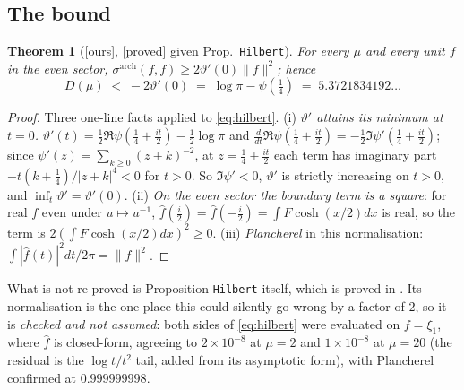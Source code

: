 \documentclass[11pt,a4paper]{article}
\theoremstyle{plain}
\newtheorem{theorem}{Theorem}[section]
\theoremstyle{definition}
\theoremstyle{remark}
\newcommand{\st}[1]{{\normalfont\sffamily\footnotesize[#1]}}
\newcommand{\proved}{\st{proved}}
\newcommand{\ours}{{\normalfont\sffamily\footnotesize[ours]}}
\begin{document}
\subsection{The bound}
\label{sec:bound}

\begin{theorem}[\ours, \proved{} given \cite{CC2023} Prop.\ \texttt{Hilbert}]
\label{thm:deficit}
For every $\mu$ and every unit $f$ in the even sector,
$\sigma^{\mathrm{arch}}(f,f)\ge2\vartheta'(0)\|f\|^2$; hence
\[
  D(\mu)\;<\;-2\vartheta'(0)\;=\;\log\pi-\psi(\tfrac14)\;=\;5.3721834192\ldots
\]
\end{theorem}

\begin{proof}
Three one-line facts applied to \eqref{eq:hilbert}.
(i) \emph{$\vartheta'$ attains its minimum at $t=0$.}
$\vartheta'(t)=\tfrac12\Re\psi(\tfrac14+\tfrac{it}2)-\tfrac12\log\pi$ and
$\frac{d}{dt}\Re\psi(\tfrac14+\tfrac{it}2)=-\tfrac12\Im\psi'(\tfrac14+\tfrac{it}2)$;
since $\psi'(z)=\sum_{k\ge0}(z+k)^{-2}$, at $z=\tfrac14+\tfrac{it}2$ each term
has imaginary part $-t(k+\tfrac14)/|z+k|^4<0$ for $t>0$.  So $\Im\psi'<0$,
$\vartheta'$ is strictly increasing on $t>0$, and
$\inf_t\vartheta'=\vartheta'(0)$.
(ii) \emph{On the even sector the boundary term is a square}: for real $f$ even
under $u\mapsto u^{-1}$, $\widehat f(\tfrac i2)=\widehat f(-\tfrac i2)=\int
F\cosh(x/2)dx$ is real, so the term is $2(\int F\cosh(x/2)dx)^2\ge0$.
(iii) \emph{Plancherel} in this normalisation:
$\int|\widehat f(t)|^2dt/2\pi=\|f\|^2$.
\end{proof}

What is not re-proved is Proposition \texttt{Hilbert} itself, which is proved in
\cite{CC2023}.  Its normalisation is the one place this could silently go wrong
by a factor of $2$, so it is \emph{checked and not assumed}: both sides of
\eqref{eq:hilbert} were evaluated on $f=\xi_1$, where $\widehat f$ is
closed-form, agreeing to $2\times10^{-8}$ at $\mu=2$ and $1\times10^{-8}$ at
$\mu=20$ (the residual is the $\log t/t^2$ tail, added from its asymptotic
form), with Plancherel confirmed at $0.999999998$.
\end{document}
